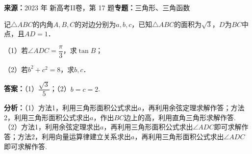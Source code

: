 \begin{question}[points=10]
\textbf{来源：}2023 年 新高考II卷，第 17 题\quad \textbf{专题：}三角形、三角函数\par
记$\triangle ABC$的内角$A,B,C$的对边分别为$a,b,c$，已知$\triangle ABC$的面积为$\sqrt{3}$，$D$为$BC$中点，且$AD=1$．

（1）若$\angle ADC=\dfrac{\pi}{3}$，求$\tan B$；

（2）若$b^{2}+c^{2}=8$，求$b,c$．
\begin{solution}
\textbf{答案：}（1）$\dfrac{\sqrt{3}}{5}$；（2）$b=c=2$.

\textbf{分析：}（1）方法1，利用三角形面积公式求出$a$，再利用余弦定理求解作答；方法2，利用三角形面积公式求出$a$，作出$BC$边上的高，利用直角三角形求解作答.
（2）方法1，利用余弦定理求出$a$，再利用三角形面积公式求出$\angle ADC$即可求解作答；方法2，利用向量运算律建立关系求出$a$，再利用三角形面积公式求出$\angle ADC$即可求解作答.


\end{solution}
\end{question}
